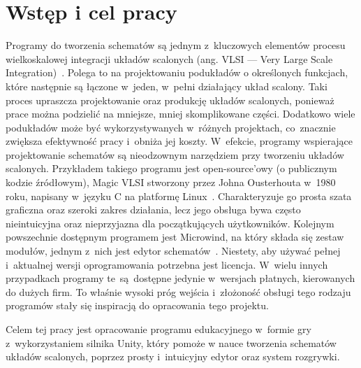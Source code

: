 \chapter{Wstęp i cel pracy}

Programy do tworzenia schematów są jednym z~kluczowych elementów
procesu wielkoskalowej integracji układów scalonych (ang. VLSI — Very Large Scale Integration)~\cite{VLSI_insemi}.
Polega to na projektowaniu podukładów o określonych funkcjach,
które następnie są łączone w~jeden, w~pełni działający układ scalony.
Taki proces upraszcza projektowanie oraz produkcję układów scalonych, ponieważ prace można podzielić na mniejsze,
mniej skomplikowane części.
Dodatkowo wiele podukładów może być wykorzystywanych w~różnych projektach,
co~znacznie zwiększa efektywność pracy i~obniża jej koszty.
W~efekcie,
programy wspierające projektowanie schematów są nieodzownym narzędziem przy tworzeniu układów scalonych.
Przykładem takiego programu jest open-source'owy (o publicznym kodzie źródłowym),
Magic VLSI stworzony przez Johna Ousterhouta w~1980 roku,
napisany w~języku C na platformę Linux~\cite{MAGIC_article}.
Charakteryzuje go prosta szata graficzna oraz szeroki zakres działania,
lecz jego obsługa bywa często nieintuicyjna oraz nieprzyjazna dla początkujących użytkowników.
Kolejnym powszechnie dostępnym programem jest Microwind,
na który składa się zestaw modułów,
jednym z~nich jest edytor schematów~\cite{Microwind}.
Niestety, aby używać pełnej i~aktualnej wersji oprogramowania potrzebna jest licencja.
W~wielu innych przypadkach programy te~są~dostępne jedynie w~wersjach płatnych, kierowanych do dużych firm.
To właśnie wysoki próg wejścia
i~złożoność obsługi tego rodzaju programów stały się inspiracją do opracowania tego projektu.
\vspace*{0.1cm}

\indent Celem tej pracy jest opracowanie programu edukacyjnego w~formie gry z~wykorzystaniem silnika Unity,
który pomoże w nauce tworzenia schematów układów scalonych,
poprzez prosty i~intuicyjny edytor oraz system rozgrywki.

